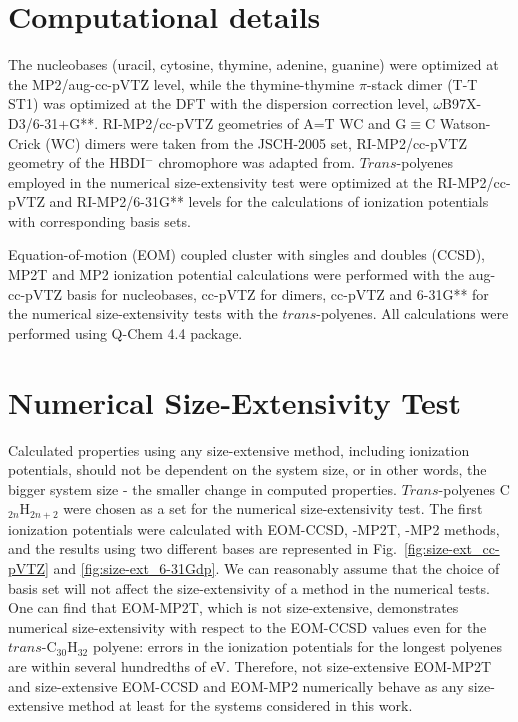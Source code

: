 \documentclass[12pt,nofootinbib]{revtex4}
\begin{document}
\section{Computational details}
The nucleobases (uracil, cytosine, thymine, adenine, guanine) were optimized at the MP2/aug-cc-pVTZ level, while the thymine-thymine $\pi$-stack dimer (T-T ST1) was optimized at the DFT with the dispersion correction level, $\omega$B97X-D3/6-31+G**. RI-MP2/cc-pVTZ geometries of A=T WC and G$\equiv$C Watson-Crick (WC) dimers were taken from 
the JSCH-2005 set,\cite{Hobza:bench:06} RI-MP2/cc-pVTZ geometry of the HBDI$^{-}$ chromophore was adapted from.\cite{Bravaya:NAB:10} $Trans$-polyenes employed in the numerical size-extensivity test were optimized at the RI-MP2/cc-pVTZ and RI-MP2/6-31G** levels for the calculations of ionization potentials with corresponding basis sets.

Equation-of-motion (EOM) coupled cluster with singles and doubles (CCSD), MP2T and MP2 ionization potential calculations were performed with the aug-cc-pVTZ basis for nucleobases, cc-pVTZ for dimers, cc-pVTZ and 6-31G** for the numerical size-extensivity tests with the $trans$-polyenes. All calculations were performed using Q-Chem 4.4 package.\cite{qchem_2014s}

\section{Numerical Size-Extensivity Test} 
Calculated properties using any size-extensive method, including ionization potentials, should not be dependent on the system size, or in other words, the bigger system size - the smaller change in computed properties.
$Trans$-polyenes C$_{2n}$H$_{2n+2}$ were chosen as a set for the numerical size-extensivity test. The first ionization potentials were calculated with EOM-CCSD, -MP2T, -MP2 methods, and the results using two different bases are represented in Fig.~\ref{fig:size-ext_cc-pVTZ} and \ref{fig:size-ext_6-31Gdp}. We can reasonably assume that the choice of basis set will not affect the size-extensivity of a method in the numerical tests. One can find that EOM-MP2T, which is not size-extensive, demonstrates numerical size-extensivity with respect to the EOM-CCSD values even for the $trans$-C$_{30}$H$_{32}$ polyene: errors in the ionization potentials for the longest polyenes are within several hundredths of eV. Therefore, not size-extensive EOM-MP2T and size-extensive EOM-CCSD and EOM-MP2 numerically behave as any size-extensive method at least for the systems considered in this work.
\end{document}
